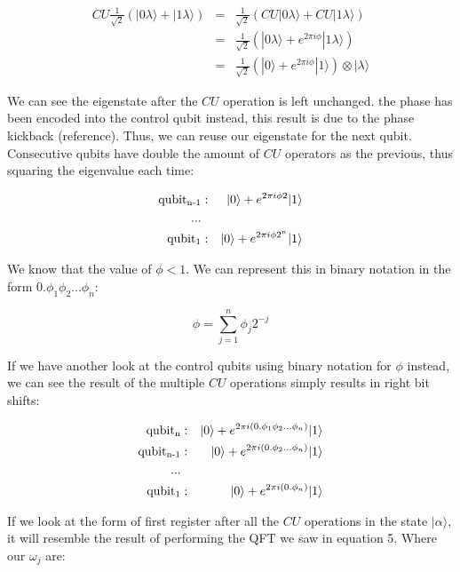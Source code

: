 \documentclass[twocolumn,showpacs,preprintnumbers,amsmath,amssymb]{revtex4}
\begin{document}
		\begin{eqnarray*}
		 CU \frac{1}{\sqrt{2}}(|0 \lambda \rangle + |1 \lambda\rangle) &=&  \frac{1}{\sqrt{2}}(CU|0 \lambda \rangle + CU|1 \lambda\rangle )\\
		 &=& \frac{1}{\sqrt{2}}(|0 \lambda \rangle + e^{2\pi i \phi}|1 \lambda\rangle)\\
		 &=&\frac{1}{\sqrt{2}}( |0 \rangle + e^{2\pi i \phi}|1 \rangle)\otimes |\lambda\rangle
		\end{eqnarray*}
		
		We can see the eigenstate after the $CU$ operation is left unchanged. the phase has been encoded into the control qubit instead, this result is due to the phase kickback (reference). Thus, we can reuse our eigenstate for the next qubit. Consecutive qubits have double the amount of $CU$ operators as the previous, thus squaring the eigenvalue each time:
		
		\begin{eqnarray*}
		\text{qubit\textsubscript{n-1}} &:&   |0 \rangle + e^{2\pi i \phi 2}|1 \rangle \\
		...\\
		\text{qubit\textsubscript{1}} &:&   |0 \rangle + e^{2\pi i \phi 2^n}|1 \rangle
	    \end{eqnarray*}
		
		We know that the value of $\phi < 1$. We can represent this in binary notation  in the form $0.\phi_1\phi_2...\phi_n$:
		
		$$\phi = \sum_{j=1}^n \phi_j 2^{-j}$$
		
		If we have another look at the control qubits using binary notation for $\phi$ instead, we can see the result of the multiple $CU$ operations simply results in right bit shifts:
		
		
		\begin{eqnarray*}
			\text{qubit\textsubscript{n}} &:&   |0 \rangle +e^{2\pi i (0.\phi_1\phi_2...\phi_n)}|1 \rangle  \\
			\text{qubit\textsubscript{n-1}} &:&   |0 \rangle + e^{2\pi i (0.\phi_2...\phi_n)}|1 \rangle \\
			...\\
			\text{qubit\textsubscript{1}} &:&   |0 \rangle + e^{2\pi i (0.\phi_n)}|1 \rangle
		\end{eqnarray*}
	
		If we look at the form of first register after all the $CU$ operations in the state $|\alpha\rangle$, it will resemble the result of performing the QFT we saw in equation 5. Where our $\omega_j$ are:
		
\end{document}
